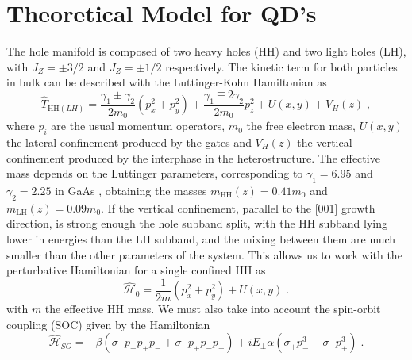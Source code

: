 
\chapter{Theoretical Model for QD's} %

\label{sec:Model} %


The hole manifold is composed of two heavy holes (HH) and two light holes (LH), with $J_Z=\pm3/2$ and $J_Z=\pm1/2$ respectively. The kinetic term for both particles in bulk can be described with the Luttinger-Kohn Hamiltonian \cite{Bulaev2005,Luttinger1956} as
\begin{equation}
	\hat{T}_{\text{HH}(LH)}=\frac{\gamma_1\pm \gamma_2}{2m_0}(p_x^2+p_y^2)+\frac{\gamma_1\mp 2\gamma_2}{2m_0}p_z^2+U(x,y)+V_H(z)\; ,
\end{equation}
where $p_i$ are the usual momentum operators, $m_0$ the free electron mass, $U(x,y)$ the lateral confinement produced by the gates and $V_H(z)$ the vertical confinement produced by the interphase in the heterostructure. The effective mass depends on the Luttinger parameters, corresponding to $\gamma_1=6.95$  and $\gamma_2=2.25$ in GaAs \cite{Bogan2018}, obtaining the masses $m_{\text{HH}}(z)=0.41m_0$ and $m_{\text{LH}}(z)=0.09m_0$. If the vertical confinement, parallel to the [001] growth direction, is strong enough the hole subband split, with the HH subband lying lower in energies than the LH subband, and the mixing between them are much smaller than the other parameters of the system. This allows us to work with the perturbative Hamiltonian for a single confined HH as
\begin{equation}
	\hat{\mathcal{H}}_0=\frac{1}{2m}(p_x^2+p_y^2)+U(x,y)\; .
\end{equation}
with $m$ the effective HH mass. We must also take into account the spin-orbit coupling (SOC) given by the Hamiltonian
\begin{equation}
	\hat{\mathcal{H}}_{SO}=-\beta (\sigma_+p_-p_+p_-+\sigma_-p_+p_-p_+) + iE_\perp\alpha(\sigma_+p_-^3-\sigma_-p_+^3)\; .
	\label{eq:SOC_Hamiltonain}
\end{equation}
